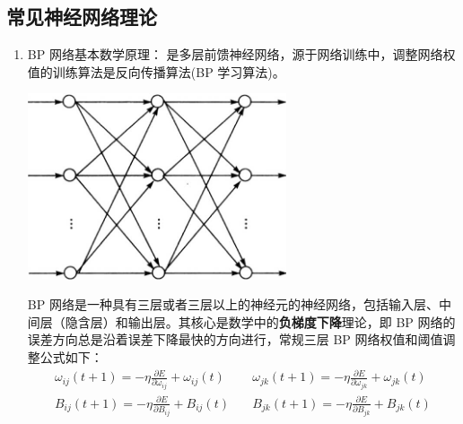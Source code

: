 \documentclass[12pt,a4paper]{article}
\begin{document}
\subsection{常见神经网络理论}
\begin{enumerate}
  \item BP 网络基本数学原理：
  是多层前馈神经网络，源于网络训练中，调整网络权值的训练算法是反向传播算法(BP 学习算法)。
  \begin{center}
    \includegraphics[width = 0.6\textwidth]{figures/3layer_illustrate.jpg}
  \end{center}
  BP 网络是一种具有三层或者三层以上的神经元的神经网络，包括输入层、中间层（隐含层）和输出层。其核心是数学中的\textbf{负梯度下降}理论，即 BP 网络的误差方向总是沿着误差下降最快的方向进行，常规三层 BP 网络权值和阈值调整公式如下：
  \begin{equation*}
    \begin{split}
      \omega_{ij}(t+1) = -\eta\frac{\partial E}{\partial \omega_{ij}} + \omega_{ij}(t) \quad& \omega_{jk}(t+1) = -\eta\frac{\partial E}{\partial\omega_{jk}} + \omega_{jk}(t)\\
      B_{ij}(t+1) = -\eta\frac{\partial E}{\partial B_{ij}} + B_{ij}(t) \quad& B_{jk}(t+1) = -\eta\frac{\partial E}{\partial B_{jk}} + B_{jk}(t)\\
    \end{split}
  \end{equation*}
\end{enumerate}
\end{document}
